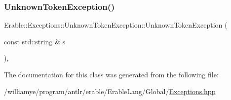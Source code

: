 \subsubsection{\texorpdfstring{UnknownTokenException()}{UnknownTokenException()}}
{\footnotesize\ttfamily Erable\+::\+Exceptions\+::\+Unknown\+Token\+Exception\+::\+Unknown\+Token\+Exception (\begin{DoxyParamCaption}\item[{const std\+::string \&}]{s }\end{DoxyParamCaption})\hspace{0.3cm}{\ttfamily [inline]}, {\ttfamily [explicit]}}



The documentation for this class was generated from the following file\+:\begin{DoxyCompactItemize}
\item 
/williamye/program/antlr/erable/\+Erable\+Lang/\+Global/\mbox{\hyperlink{_exceptions_8hpp}{Exceptions.\+hpp}}\end{DoxyCompactItemize}
